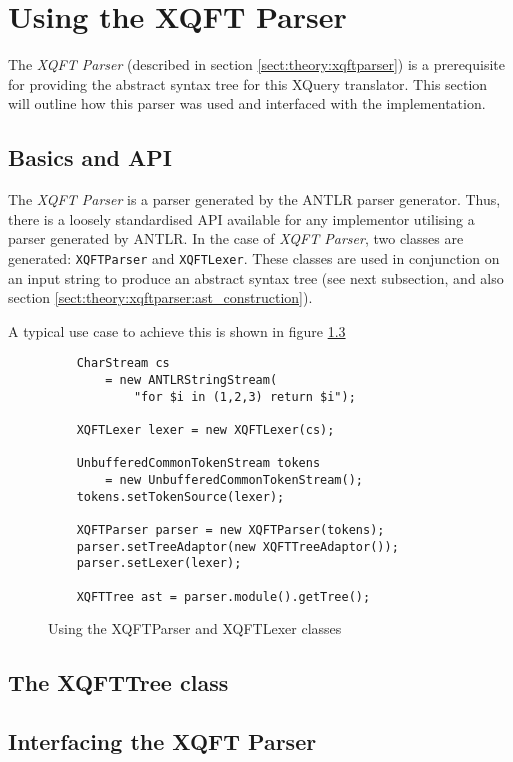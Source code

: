 \section{Using the XQFT Parser}
The \textit{XQFT Parser}\cite{ourselves} (described in section
\ref{sect:theory:xqftparser}) is a prerequisite for providing the abstract
syntax tree for this XQuery translator. This section will outline how this
parser was used and interfaced with the implementation.

\subsection{Basics and API}
The \textit{XQFT Parser} is a parser generated by the ANTLR parser generator.
Thus, there is a loosely standardised API available for any implementor
utilising a parser generated by ANTLR. In the case of \textit{XQFT Parser}, two
classes are generated: \texttt{XQFTParser} and \texttt{XQFTLexer}. These
classes are used in conjunction on an input string to produce an abstract syntax
tree (see next subsection, and also section
\ref{sect:theory:xqftparser:ast_construction}).

A typical use case to achieve this is shown in figure \ref{}

\begin{figure}[!htp]
\begin{center}
  \begin{Verbatim}
    CharStream cs 
        = new ANTLRStringStream(
            "for $i in (1,2,3) return $i");

    XQFTLexer lexer = new XQFTLexer(cs);

    UnbufferedCommonTokenStream tokens 
        = new UnbufferedCommonTokenStream();
	tokens.setTokenSource(lexer);

    XQFTParser parser = new XQFTParser(tokens);
    parser.setTreeAdaptor(new XQFTTreeAdaptor());
    parser.setLexer(lexer);

    XQFTTree ast = parser.module().getTree();
  \end{Verbatim}
  \caption{Using the XQFTParser and XQFTLexer classes}
  \label{figure:impl:using_xqft}
\end{center}
\end{figure}

\subsection{The XQFTTree class}
\subsection{Interfacing the XQFT Parser}